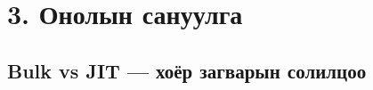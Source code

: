 \hypertarget{ux43eux43dux43eux43bux44bux43d-ux441ux430ux43dux443ux443ux43bux433ux430}{%
\section{3. Онолын сануулга}\label{ux43eux43dux43eux43bux44bux43d-ux441ux430ux43dux443ux443ux43bux433ux430}}

\hypertarget{bulk-vs-jit-ux445ux43eux451ux440-ux437ux430ux433ux432ux430ux440ux44bux43d-ux441ux43eux43bux438ux43bux446ux43eux43e}{%
\subsection{Bulk vs JIT --- хоёр загварын солилцоо}\label{bulk-vs-jit-ux445ux43eux451ux440-ux437ux430ux433ux432ux430ux440ux44bux43d-ux441ux43eux43bux438ux43bux446ux43eux43e}}


